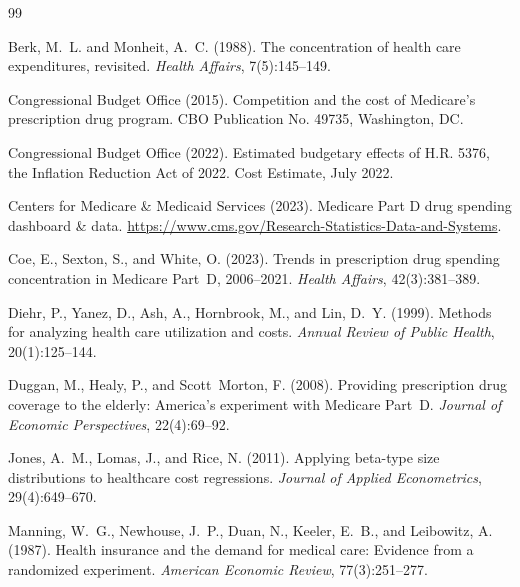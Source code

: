 \documentclass[12pt,letterpaper]{article}
\begin{document}
\begin{thebibliography}{99}

Berk, M.~L. and Monheit, A.~C. (1988).
\newblock The concentration of health care expenditures, revisited.
\newblock \textit{Health Affairs}, 7(5):145--149.

Congressional Budget Office (2015).
\newblock Competition and the cost of Medicare's prescription drug program.
\newblock CBO Publication No. 49735, Washington, DC.

Congressional Budget Office (2022).
\newblock Estimated budgetary effects of H.R. 5376, the Inflation Reduction
  Act of 2022.
\newblock Cost Estimate, July 2022.

Centers for Medicare \& Medicaid Services (2023).
\newblock Medicare Part D drug spending dashboard \& data.
\newblock \url{https://www.cms.gov/Research-Statistics-Data-and-Systems}.

Coe, E., Sexton, S., and White, O. (2023).
\newblock Trends in prescription drug spending concentration in Medicare Part~D,
  2006--2021.
\newblock \textit{Health Affairs}, 42(3):381--389.

Diehr, P., Yanez, D., Ash, A., Hornbrook, M., and Lin, D.~Y. (1999).
\newblock Methods for analyzing health care utilization and costs.
\newblock \textit{Annual Review of Public Health}, 20(1):125--144.

Duggan, M., Healy, P., and Scott~Morton, F. (2008).
\newblock Providing prescription drug coverage to the elderly: America's
  experiment with Medicare Part~D.
\newblock \textit{Journal of Economic Perspectives}, 22(4):69--92.

Jones, A.~M., Lomas, J., and Rice, N. (2011).
\newblock Applying beta-type size distributions to healthcare cost regressions.
\newblock \textit{Journal of Applied Econometrics}, 29(4):649--670.

Manning, W.~G., Newhouse, J.~P., Duan, N., Keeler, E.~B., and Leibowitz, A.
  (1987).
\newblock Health insurance and the demand for medical care: Evidence from a
  randomized experiment.
\newblock \textit{American Economic Review}, 77(3):251--277.


\end{thebibliography}
\end{document}
